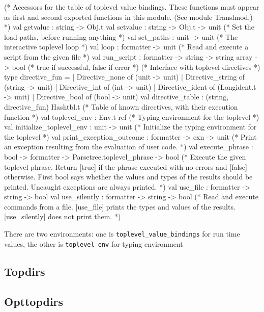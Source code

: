 \begin{ocamlcode}
(* Accessors for the table of toplevel value bindings.  These functions
   must appear as first and second exported functions in this module.
   (See module Translmod.) *)
val getvalue : string -> Obj.t
val setvalue : string -> Obj.t -> unit
(* Set the load paths, before running anything *)
val set_paths : unit -> unit
(* The interactive toplevel loop *)
val loop : formatter -> unit
(* Read and execute a script from the given file *)
val run_script : formatter -> string -> string array -> bool
        (* true if successful, false if error *)
(* Interface with toplevel directives *)
type directive_fun =
   | Directive_none of (unit -> unit)
   | Directive_string of (string -> unit)
   | Directive_int of (int -> unit)
   | Directive_ident of (Longident.t -> unit)
   | Directive_bool of (bool -> unit)
val directive_table : (string, directive_fun) Hashtbl.t
        (* Table of known directives, with their execution function *)
val toplevel_env : Env.t ref
        (* Typing environment for the toplevel *)
val initialize_toplevel_env : unit -> unit
        (* Initialize the typing environment for the toplevel *)
val print_exception_outcome : formatter -> exn -> unit
        (* Print an exception resulting from the evaluation of user code. *)
val execute_phrase : bool -> formatter -> Parsetree.toplevel_phrase -> bool
        (* Execute the given toplevel phrase. Return [true] if the
           phrase executed with no errors and [false] otherwise.
           First bool says whether the values and types of the results
           should be printed. Uncaught exceptions are always printed. *)
val use_file : formatter -> string -> bool
val use_silently : formatter -> string -> bool
        (* Read and execute commands from a file.
           [use_file] prints the types and values of the results.
           [use_silently] does not print them. *)
\end{ocamlcode}

There are two environments: one is \verb|toplevel_value_bindings| for
run time values, the other is \verb|toplevel_env| for typing environment
\subsection{Topdirs}
\subsection{Opttopdirs}



